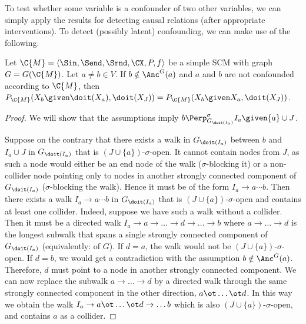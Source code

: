 To test whether some variable is a confounder of two other variables, we can simply apply the results for detecting causal relations (after appropriate interventions).
To detect (possibly latent) confounding, we can make use of the following.
\begin{Prp}\label{prp:scm_confounded_separation}
Let $\C{M} = \langle \Sin, \Send, \Srnd, \CX, P, f \rangle$ be a simple SCM with graph $G = G(\C{M})$.
Let $a \ne b \in V$.
If $b \notin \Anc^G(a)$ and $a$ and $b$ are not confounded according to $\C{M}$, then
  $P_{\C{M}}(X_b \given \doit(X_a), \doit(X_J)) = P_{\C{M}}(X_b \given X_a, \doit(X_J))$.
\end{Prp}
\begin{proof}
We will show that the assumptions imply $b \Perp^\sigma_{G_{\doit(I_a)}} I_a \given \{a\} \cup J$.

Suppose on the contrary that there exists a walk in $G_{\doit(I_a)}$ between $b$ and $I_a \cup J$ in $G_{\doit(I_a)}$ that is 
$(J \cup \{a\})$-$\sigma$-open. 
It cannot contain nodes from $J$, as such a node would either be an end node of the walk ($\sigma$-blocking it)
or a non-collider node pointing only to nodes in another strongly connected component of $G_{\doit(I_a)}$
($\sigma$-blocking the walk).
Hence it must be of the form $I_a \to a \cdots b$. 
Then there exists a walk $I_a \to a \cdots b$ in $G_{\doit(I_a)}$ that is $(J \cup \{a\})$-$\sigma$-open and contains at least one collider. 
Indeed, suppose we have such a walk without a collider. Then it must be a directed walk
$I_a \to a \to \dots \to d \to \dots \to b$ where $a \to \dots \to d$ is the longest subwalk that spans
a single strongly connected component of $G_{\doit(I_a)}$ (equivalently: of $G$). 
If $d = a$, the walk would not be $(J \cup \{a\})$-$\sigma$-open.
If $d = b$, we would get a contradiction with the assumption $b \notin \Anc^G(a)$. 
Therefore, $d$ must point to a node in another strongly connected component.
We can now replace the subwalk $a \to \dots \to d$ by
a directed walk through the same strongly connected component in the other direction, $a \ot \dots \ot d$.
In this way we obtain the walk
$I_a \to a \ot \dots \ot d \to \dots b$ which is also $(J \cup \{a\})$-$\sigma$-open, and contains $a$ as a collider.


\end{proof}
